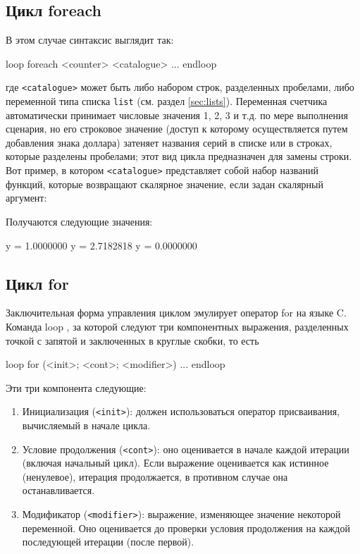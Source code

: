 \subsection{Цикл foreach}
\label{sec:loop-foreach}
В этом случае синтаксис выглядит так:
\begin{code}
loop foreach <counter> <catalogue>
   ...
endloop
\end{code}
где \texttt{<catalogue>} может быть либо набором строк, разделенных
пробелами, либо переменной типа списка \texttt{list} (см. раздел
\ref{sec:lists}). Переменная счетчика автоматически принимает числовые
значения 1, 2, 3 и т.д. по мере выполнения сценария, но его строковое
значение (доступ к которому осуществляется путем добавления знака
доллара) затеняет названия серий в списке или в строках, которые
разделены пробелами; этот вид цикла предназначен для замены строки.
Вот пример, в котором \texttt{<catalogue>} представляет собой набор
названий функций, которые возвращают скалярное значение, если задан
скалярный аргумент:


Получаются следующие значения:
\begin{code}
              y =  1.0000000
              y =  2.7182818
              y =  0.0000000
\end{code}

\subsection{Цикл for}

Заключительная форма управления циклом эмулирует оператор for на языке
C. Команда loop , за которой следуют три компонентных
выражения, разделенных точкой с запятой и заключенных в круглые
скобки, то есть
\begin{code}
loop for (<init>; <cont>; <modifier>)
   ...
endloop
\end{code}
Эти три компонента следующие:
\begin{enumerate}
\item Инициализация (\texttt{<init>}): должен использоваться оператор
  присваивания, вычисляемый в начале цикла.
\item Условие продолжения (\texttt{<cont>}): оно оценивается в начале
  каждой итерации (включая начальный цикл). Если выражение оценивается
  как истинное (ненулевое), итерация продолжается, в противном случае
  она останавливается.
\item Модификатор (\texttt{<modifier>}): выражение, изменяющее
  значение некоторой переменной. Оно оценивается до проверки условия
  продолжения на каждой последующей итерации (после первой).
\end{enumerate}

